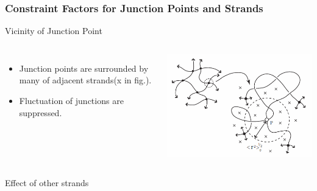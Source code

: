 \documentclass[12pt, dvipdfmx]{beamer}
\begin{document}
\begin{frame}
	\frametitle{Constraint Factors for Junction Points and Strands}
		\vspace{-2mm}
		\begin{alertblock}{Vicinity of Junction Point}
			\begin{columns}[totalwidth=1\textwidth]
				\vspace{-3mm}
				\begin{itemize}
					\item Junction points are surrounded by many of \alert{adjacent strands(x in fig.).}
					\item Fluctuation of junctions are \alert{suppressed}. 
				\end{itemize}
				\centering
				\includegraphics[width=\textwidth]{JP_vicinity.png}
			\end{columns}
		\end{alertblock}
		\vspace{-1mm}
		\begin{block}{Effect of other strands}
\end{block}
\end{frame}
\end{document}
